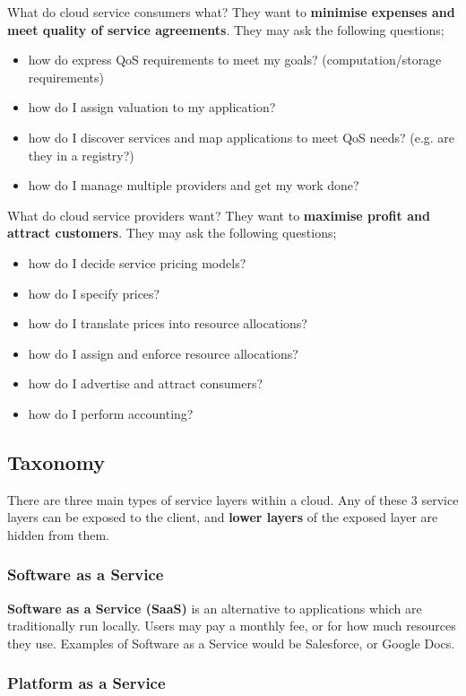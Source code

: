 \documentclass{article}
\begin{document}
{What do cloud service consumers what? They want to \textbf{minimise expenses and meet quality of service agreements}. They may ask the following questions;
\begin{itemize}
	\item how do express QoS requirements to meet my goals? (computation/storage requirements)
	\item how do I assign valuation to my application?
	\item how do I discover services and map applications to meet QoS needs? (e.g. are they in a registry?)
	\item how do I manage multiple providers and get my work done?
\end{itemize}

What do cloud service providers want? They want to \textbf{maximise profit and attract customers}. They may ask the following questions;
\begin{itemize}
	\item how do I decide service pricing models?
	\item how do I specify prices?
	\item how do I translate prices into resource allocations?
	\item how do I assign and enforce resource allocations?
	\item how do I advertise and attract consumers?
	\item how do I perform accounting?
\end{itemize}

\subsection{Taxonomy}

There are three main types of service layers within a cloud. Any of these 3 service layers can be exposed to the client, and \textbf{lower layers} of the exposed layer are hidden from them.

\subsubsection{Software as a Service}

\textbf{Software as a Service (SaaS)} is an alternative to applications which are traditionally run locally. Users may pay a monthly fee, or for how much resources they use. Examples of Software as a Service would be Salesforce, or Google Docs.

\subsubsection{Platform as a Service}

}
\end{document}
